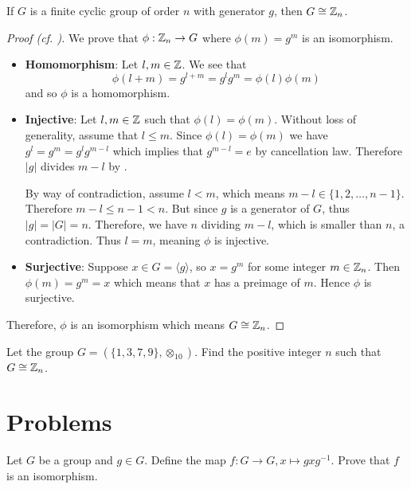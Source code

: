 \begin{theorem}\label{thrm-finite-cyclic-group-isomorphic-to-Zn}
    If $G$ is a finite cyclic group of order $n$ with generator $g$, then $G \cong \mathbb{Z}_n$.
\end{theorem}
\begin{proof}[Proof (cf. {\cite[\S 63]{clark_1984}})]
    We prove that $\phi: \mathbb{Z}_n \to G$ where $\phi(m) = g^m$ is an isomorphism.
    \begin{itemize}
        \item \textbf{Homomorphism}: Let $l,m \in \mathbb{Z}$. We see that
        \[
            \phi(l+m) = g^{l+m} = g^lg^m = \phi(l)\phi(m)
        \]
        and so $\phi$ is a homomorphism.

        \item \textbf{Injective}: Let $l, m \in \mathbb{Z}$ such that $\phi(l) = \phi(m)$. Without loss of generality, assume that $l \leq m$. Since $\phi(l) = \phi(m)$ we have $g^l = g^m = g^lg^{m-l}$ which implies that $g^{m-l} = e$ by cancellation law. Therefore $|g|$ divides $m-l$ by .

        By way of contradiction, assume $l < m$, which means $m - l \in \{1, 2,\dots, n-1\}$. Therefore $m-l \leq n - 1 < n$. But since $g$ is a generator of $G$, thus $|g| = |G| = n$. Therefore, we have $n$ dividing $m-l$, which is smaller than $n$, a contradiction. Thus $l = m$, meaning $\phi$ is injective.

        \item \textbf{Surjective}: Suppose $x \in G = \langle g\rangle$, so $x = g^m$ for some integer $m \in \mathbb{Z}_n$. Then $\phi(m) = g^m = x$ which means that $x$ has a preimage of $m$. Hence $\phi$ is surjective.
    \end{itemize}

    Therefore, $\phi$ is an isomorphism which means $G \cong \mathbb{Z}_n$.
\end{proof}

\begin{exercise}
    Let the group $G = (\{1, 3, 7, 9\}, \otimes_{10})$. Find the positive integer $n$ such that $G \cong \mathbb{Z}_n$.
\end{exercise}

\newpage

\section{Problems}
\begin{problem}
    Let $G$ be a group and $g \in G$. Define the map $f: G \to G, x \mapsto gxg^{-1}$. Prove that $f$ is an isomorphism.
\end{problem}

